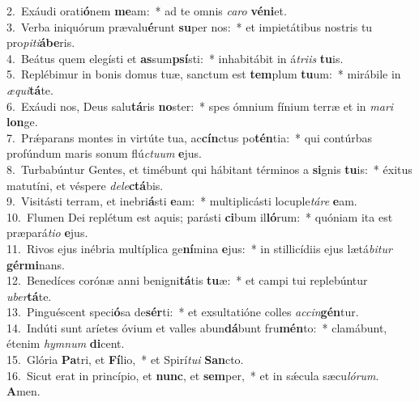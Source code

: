 {2.~}Exáudi orati\textbf{ó}nem \textbf{me}am:~* ad te omnis \textit{ca}\textit{ro} \textbf{vé}\textbf{ni}et.\\
{3.~}Verba iniquórum prævalu\textbf{é}runt \textbf{su}per nos:~* et impietátibus nostris tu pro\textit{pi}\textit{ti}\textbf{á}\textbf{be}ris.\\
{4.~}Beátus quem elegísti et \textbf{as}sum\textbf{psí}sti:~* inhabitábit in á\textit{tri}\textit{is} \textbf{tu}is.\\
{5.~}Replébimur in bonis domus tuæ, sanctum est \textbf{tem}plum \textbf{tu}um:~* mirábile in \textit{æ}\textit{qui}\textbf{tá}te.\\
{6.~}Exáudi nos, Deus salu\textbf{tá}ris \textbf{no}ster:~* spes ómnium fínium terræ et in \textit{ma}\textit{ri} \textbf{lon}ge.\\
{7.~}Prǽparans montes in virtúte tua, ac\textbf{cín}ctus po\textbf{tén}tia:~* qui contúrbas profúndum maris sonum flú\textit{ctu}\textit{um} \textbf{e}jus.\\
{8.~}Turbabúntur Gentes, et timébunt qui hábitant términos a \textbf{si}gnis \textbf{tu}is:~* éxitus matutíni, et véspere \textit{de}\textit{le}\textbf{ctá}bis.\\
{9.~}Visitásti terram, et inebri\textbf{á}sti \textbf{e}am:~* multiplicásti locuple\textit{tá}\textit{re} \textbf{e}am.\\
{10.~}Flumen Dei replétum est aquis; parásti \textbf{ci}bum il\textbf{ló}rum:~* quóniam ita est præpará\textit{ti}\textit{o} \textbf{e}jus.\\
{11.~}Rivos ejus inébria multíplica ge\textbf{ní}mina \textbf{e}jus:~* in stillicídiis ejus lætá\textit{bi}\textit{tur} \textbf{gér}\textbf{mi}nans.\\
{12.~}Benedíces corónæ anni benigni\textbf{tá}tis \textbf{tu}æ:~* et campi tui replebúntur \textit{u}\textit{ber}\textbf{tá}te.\\
{13.~}Pinguéscent speci\textbf{ó}sa de\textbf{sér}ti:~* et exsultatióne colles \textit{ac}\textit{cin}\textbf{gén}tur.\\
{14.~}Indúti sunt aríetes óvium et valles abun\textbf{dá}bunt fru\textbf{mén}to:~* clamábunt, étenim \textit{hym}\textit{num} \textbf{di}cent.\\
{15.~}Glória \textbf{Pa}tri, et \textbf{Fí}lio,~* et Spirí\textit{tu}\textit{i} \textbf{San}cto.\\
{16.~}Sicut erat in princípio, et \textbf{nunc}, et \textbf{sem}per,~* et in sǽcula sæcu\textit{ló}\textit{rum}. \textbf{A}men.\\
